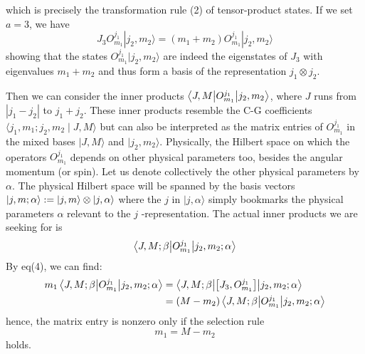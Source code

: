\documentclass{article}
\begin{document}
	which is precisely the transformation rule (2) of tensor-product states. If we set $a=3$, we have
	\begin{equation*}
		J_{3} O_{m_{1}}^{j_{1}}| j_{2} ,m_{2}\rangle  =( m_{1} +m_{2}) O_{m_{1}}^{j_{1}}| j_{2} ,m_{2}\rangle  
	\end{equation*}
	showing that the states $O_{m_{1}}^{j_{1}}| j_{2} ,m_{2}\rangle  $ are indeed the eigenstates of $J_{3}$ with eigenvalues $m_{1} +m_{2}$ and thus form a basis of the representation $j_{1} \otimes j_{2}$.
	
	Then we can consider the inner products $\mel**{J,M}{O_{m_{1}}^{j_{1}}}{j_{2} ,m_{2}}$, where $J$ runs from $| j_{1} -j_{2}| $ to $j_{1} +j_{2}$. These inner products resemble the C-G coefficients $\langle  j_{1} ,m_{1} ;j_{2} ,m_{2} \mid J,M\rangle  $ but can also be interpreted as the matrix entries of $O_{m_{1}}^{j_{1}}$ in the mixed bases $|J,M\rangle  $ and $| j_{2} ,m_{2}\rangle  $. Physically, the Hilbert space on which the operators $O_{m_{1}}^{j_{1}}$ depends on other physical parameters too, besides the angular momentum (or spin). Let us denote collectively the other physical parameters by $\alpha $. The physical Hilbert space will be spanned by the basis vectors $|j,m;\alpha \rangle  :=\ket{j,m} \otimes \ket{j,\alpha }$ where the $j$ in $|j,\alpha \rangle  $ simply bookmarks the physical parameters $\alpha $ relevant to the $j$ -representation. The actual inner products we are seeking for is
	\begin{equation*}
		\mel**{J,M;\beta }{O_{m_{1}}^{j_{1}}}{j_{2} ,m_{2} ;\alpha }
	\end{equation*}
	By eq(4), we can find:
	\begin{equation*}
		\begin{aligned}
			m_{1}\mel**{J,M;\beta }{O_{m_{1}}^{j_{1}}}{j_{2} ,m_{2} ;\alpha } & =\mel**{J,M;\beta }{\left[ J_{3} ,O_{m_{1}}^{j_{1}}\right]}{j_{2} ,m_{2} ;\alpha }\\
			& =( M-m_{2})\mel**{J,M;\beta }{O_{m_{1}}^{j_{1}}}{j_{2} ,m_{2} ;\alpha }
		\end{aligned}
	\end{equation*}
	hence, the matrix entry is nonzero only if the selection rule
	\begin{equation*}
		m_{1} =M-m_{2}
	\end{equation*}
	holds. 
	
\end{document}

